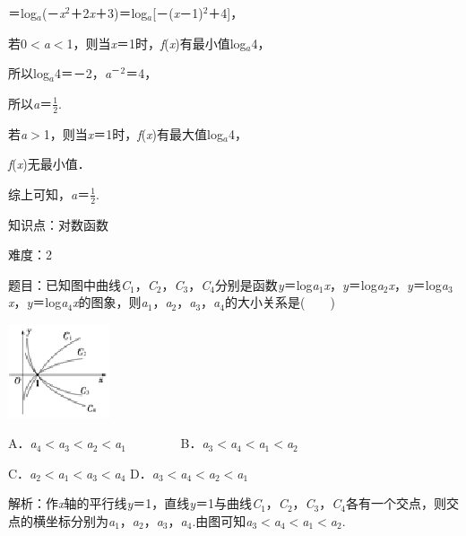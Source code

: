 \documentclass{article} %
\begin{document}
＝log\textit{${}_{a}$}(－\textit{x}${}^{2}$＋2\textit{x}＋3)＝log\textit{${}_{a}$}[－(\textit{x}－1)${}^{2}$＋4]，

若0$\mathrm{<}$\textit{a}$\mathrm{<}$1，则当\textit{x}＝1时，\textit{f}(\textit{x})有最小值log\textit{${}_{a}$}4，

所以log\textit{${}_{a}$}4＝－2，\textit{a}${}^{\textrm{－}}$${}^{2}$＝4，

所以\textit{a}＝$\frac{1}{2}$.

若\textit{a}$\mathrm{>}$1，则当\textit{x}＝1时，\textit{f}(\textit{x})有最大值log\textit{${}_{a}$}4，

\textit{f}(\textit{x})无最小值．

综上可知，\textit{a}＝$\frac{1}{2}$.

知识点：对数函数

难度：2

题目：已知图中曲线\textit{C}${}_{1}$，\textit{C}${}_{2}$，\textit{C}${}_{3}$，\textit{C}${}_{4}$分别是函数\textit{y}＝log\textit{a}${}_{1}$\textit{x}，\textit{y}＝log\textit{a}${}_{2}$\textit{x}，\textit{y}＝log\textit{a}${}_{3}$\textit{x}，\textit{y}＝log\textit{a}${}_{4}$\textit{x}的图象，则\textit{a}${}_{1}$，\textit{a}${}_{2}$，\textit{a}${}_{3}$，\textit{a}${}_{4}$的大小关系是(　　)

\includegraphics*[width=1.19in, height=1.09in, keepaspectratio=false]{image61}

A．\textit{a}${}_{4}$$\mathrm{<}$\textit{a}${}_{3}$$\mathrm{<}$\textit{a}${}_{2}$$\mathrm{<}$\textit{a}${}_{1}$　　　　 B．\textit{a}${}_{3}$$\mathrm{<}$\textit{a}${}_{4}$$\mathrm{<}$\textit{a}${}_{1}$$\mathrm{<}$\textit{a}${}_{2}$

C．\textit{a}${}_{2}$$\mathrm{<}$\textit{a}${}_{1}$$\mathrm{<}$\textit{a}${}_{3}$$\mathrm{<}$\textit{a}${}_{4}$   D．\textit{a}${}_{3}$$\mathrm{<}$\textit{a}${}_{4}$$\mathrm{<}$\textit{a}${}_{2}$$\mathrm{<}$\textit{a}${}_{1}$

解析：作\textit{x}轴的平行线\textit{y}＝1，直线\textit{y}＝1与曲线\textit{C}${}_{1}$，\textit{C}${}_{2}$，\textit{C}${}_{3}$，\textit{C}${}_{4}$各有一个交点，则交点的横坐标分别为\textit{a}${}_{1}$，\textit{a}${}_{2}$，\textit{a}${}_{3}$，\textit{a}${}_{4}$.由图可知\textit{a}${}_{3}$$\mathrm{<}$\textit{a}${}_{4}$$\mathrm{<}$\textit{a}${}_{1}$$\mathrm{<}$\textit{a}${}_{2}$.
\end{document}
